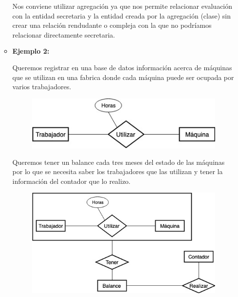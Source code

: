 \documentclass[letterpaper,11pt]{article}
\begin{document}
\begin{itemize}
\begin{itemize}
               Nos conviene utilizar agregación ya que nos
               permite relacionar evaluación con la entidad
               secretaria y la entidad creada por la agregación (clase)
               sin crear una relación rendudante o compleja con la que
               no podríamos relacionar directamente secretaria.



            \item \textbf{Ejemplo 2:}

            Queremos registrar en una base de datos información acerca
            de máquinas que se utilizan en una fabrica donde cada máquina
            puede ser ocupada por varios trabajadores.

            \begin{figure}[h]
             \centering
             \includegraphics[scale=0.6]{./imagenes/Ejemplo2.jpg}
             \end{figure}

            Queremos tener un balance cada tres meses del estado de las
            máquinas por lo que se necesita saber los trabajadores que
            las utilizan y tener la información del contador que lo realizo.

            \begin{figure}[H]
                \centering
                \includegraphics[scale=0.6]{./imagenes/Ejemplo2a.jpg}
                \end{figure}


\end{itemize}
\end{itemize}
\end{document}
